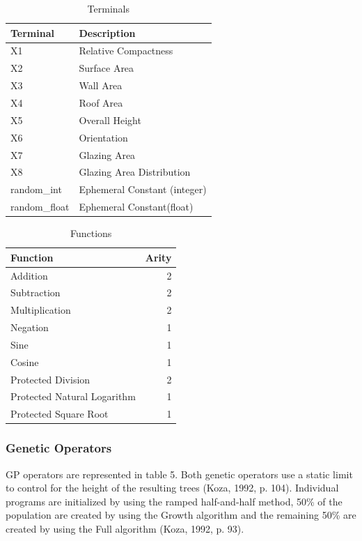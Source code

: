 \documentclass[
  12pt,
]{article}
\begin{document}
\begin{table}[!h]

\caption{\label{tab:unnamed-chunk-3}Terminals}
\centering
\begin{tabular}[t]{l|l}
\hline
\textbf{Terminal} & \textbf{Description}\\
\hline
X1 & Relative Compactness\\
\hline
X2 & Surface Area\\
\hline
X3 & Wall Area\\
\hline
X4 & Roof Area\\
\hline
X5 & Overall Height\\
\hline
X6 & Orientation\\
\hline
X7 & Glazing Area\\
\hline
X8 & Glazing Area Distribution\\
\hline
random\_int & Ephemeral Constant (integer)\\
\hline
random\_float & Ephemeral Constant(float)\\
\hline
\end{tabular}
\end{table}

\begin{table}[!h]

\caption{\label{tab:unnamed-chunk-4}Functions}
\centering
\begin{tabular}[t]{l|r}
\hline
\textbf{Function} & \textbf{Arity}\\
\hline
Addition & 2\\
\hline
Subtraction & 2\\
\hline
Multiplication & 2\\
\hline
Negation & 1\\
\hline
Sine & 1\\
\hline
Cosine & 1\\
\hline
Protected Division & 2\\
\hline
Protected Natural Logarithm & 1\\
\hline
Protected Square Root & 1\\
\hline
\end{tabular}
\end{table}

\hypertarget{genetic-operators}{%
\subsubsection{Genetic Operators}\label{genetic-operators}}

GP operators are represented in table 5. Both genetic operators use a
static limit to control for the height of the resulting trees (Koza,
1992, p. 104). Individual programs are initialized by using the ramped
half-and-half method, 50\% of the population are created by using the
Growth algorithm and the remaining 50\% are created by using the Full
algorithm (Koza, 1992, p. 93).
\end{document}

